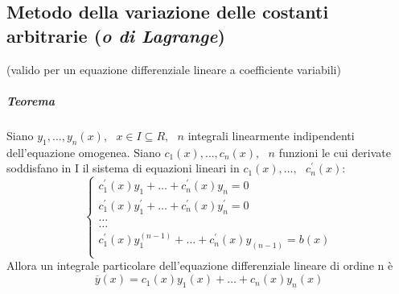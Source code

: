 \subsection{Metodo della variazione delle costanti arbitrarie (\textit{o di Lagrange})}
(valido per un equazione differenziale lineare a coefficiente variabili)
\subparagraph{Teorema}
Siano $y_1,\dots,y_n(x),\text{ } x\in I \subseteq R,\text{ }n$ integrali  linearmente indipendenti dell'equazione omogenea. Siano $c_1(x),\dots,c_n(x),\text{ }n$ funzioni le cui derivate soddisfano in I il sistema di equazioni lineari in $c_1(x),\dots,\text{ } c_n^\prime(x)$:
\begin{equation*}
	\begin{cases}
		c_1^\prime(x)y_1+\dots+c_n^\prime(x)y_n=0\\
		c_1^\prime(x)y_1^\prime+\dots+c_n^\prime(x)y_n^\prime=0\\
		\dots\\
		\dots\\
		c_1^\prime(x)y_1^{(n-1)}+\dots+c_n^\prime(x)y_{(n-1)}=b(x)\\
	\end{cases}
\end{equation*}
Allora un integrale particolare dell'equazione differenziale lineare di ordine n è
\begin{equation*}
	\overline{y}(x)=c_1(x)y_1(x)+\dots+c_n(x)y_n(x)
\end{equation*}
